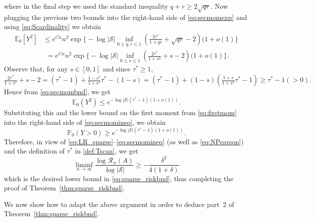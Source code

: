 \documentclass[11pt,reqno,letterpaper]{amsart}
\numberwithin{equation}{section}
\theoremstyle{plain}
\def \E{\mathbb{E}}
\def \P{\mathbb{P}}
\begin{document}
where in the final step we used the standard inequality $q + r \ge 2\sqrt{qr}$. 
Now plugging the previous two bounds into the right-hand side of \eqref{eq:secmomexp} and using \eqref{eq:Scardinality} 
we obtain
\begin{equation}\label{eq:secmombnd}
\begin{split}
\E_0[Y^2] 
&\le e^{Cn} n^2 \exp\big\{-\log |\mathcal S| \inf_{0\le q, r \le 1}( \tfrac{2\tau^\ast}{1 + qr}  + \sqrt{qr} - 2) (1 + o(1) \big\}\\
&\:\:= e^{Cn} n^2\exp\big\{-\log |\mathcal S| \inf_{0\le s \le 1}( \tfrac{2\tau^\ast}{1 + s^2}  + s - 2) (1 + o(1) \big\}.
\end{split} 
\end{equation}
Observe that, for any $s \in [0, 1]$ and since $\tau^\ast \ge 1$,
\begin{equation*}
\tfrac{2\tau^\ast}{1 + s^2}  + s - 2 = (\tau^\ast - 1) + \tfrac{1 - s^2}{1 + s^2} \tau^\ast - (1 - s) = (\tau^\ast - 1) + (1 - s)(\tfrac{1 + s}{1 + s^2} \tau^\ast - 1) \ge \tau^\ast - 1 (> 0).
\end{equation*}
Hence from \eqref{eq:secmombnd}, we get
\begin{equation*}
\E_0(Y^2) \le e^{-\log |\mathcal S|(\tau^\ast - 1)(1 + o(1))}.
\end{equation*}
Substituting this and the lower bound on the first moment from \eqref{eq:firstmom} into the 
right-hand side of \eqref{eq:secmomineq}, we obtain
\begin{equation*}
\P_0(Y>0) \ge e^{-\log |\mathcal S|(\tau^\ast - 1)(1 + o(1))}.
\end{equation*}
Therefore, in view of \eqref{eq:LR_sparse}--\eqref{eq:secmomineq} (as well as 
\eqref{eq:NPearson}) and the definition of $\tau^\ast$ in \eqref{def:Tscan}, we get
\begin{equation*}%
\liminf_{n\rightarrow \infty}\frac{\log{\mathcal R_n(A)}}{\log{|\mathcal{S}|}} \ge -\frac{\delta^2}{4(1+\delta)}
\end{equation*}
which is the desired lower bound in \eqref{eq:sparse_riskbnd}, thus completing the proof of Theorem~\ref{thm:sparse_riskbnd}. 

\medskip

We now show how to adapt the above argument in order to deduce part~2 of 
Theorem~\ref{thm:sparse_riskbnd}.

\vspace{0.15cm}
\end{document}
